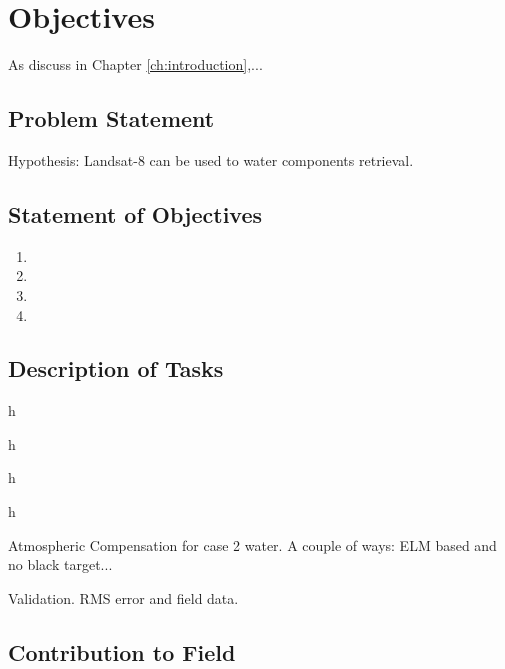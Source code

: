 \chapter{Objectives}
\label{ch:objectives}

As discuss in Chapter \ref{ch:introduction},...

\section{Problem Statement}
\label{sec:problemstatement}
Hypothesis: Landsat-8 can be used to water components retrieval.

\section{Statement of Objectives}
\label{sec:objectives}

\begin{enumerate}
	\item 
	\item
	\item
	\item
\end{enumerate}

\section{Description of Tasks}
\begin{enumerate}
	{\bf \item h }
	{\bf \item h}
	{\bf \item h}
	{\bf \item h}
\end{enumerate}


Atmospheric Compensation for case 2 water. A couple of ways: ELM based and no black target...

Validation. RMS error and field data.

\section{Contribution to Field}
\label{contributiontofield}